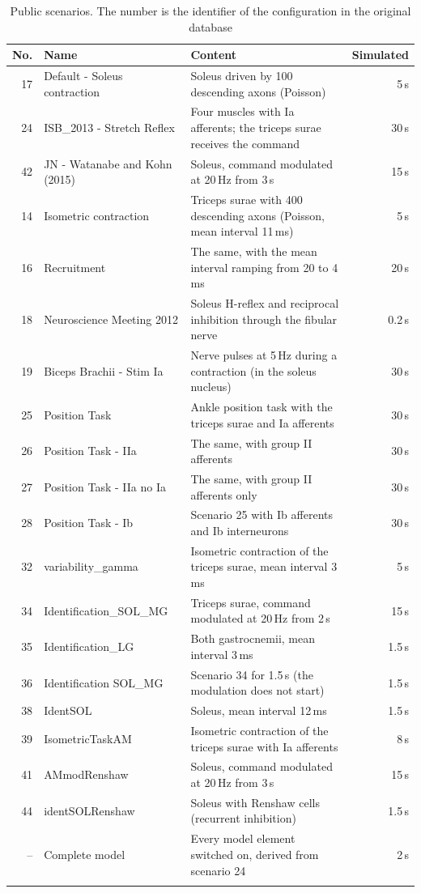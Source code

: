 \documentclass[pdflatex,sn-apa,iicol]{sn-jnl}
\begin{document}
\begin{table}[t]
\caption{Public scenarios. The number is the identifier of the configuration in the original database}\label{tab:scenarios}
\begin{tabular}{@{}rp{}p{}r@{}}
\toprule
No. & Name & Content & Simulated \\
\midrule
17 & Default - Soleus contraction & Soleus driven by 100 descending axons (Poisson) & 5\,s \\
24 & ISB\_2013 - Stretch Reflex & Four muscles with Ia afferents; the triceps surae receives the command & 30\,s \\
42 & JN - Watanabe and Kohn (2015) & Soleus, command modulated at 20\,Hz from 3\,s & 15\,s \\
14 & Isometric contraction & Triceps surae with 400 descending axons (Poisson, mean interval 11\,ms) & 5\,s \\
16 & Recruitment & The same, with the mean interval ramping from 20 to 4\,ms & 20\,s \\
18 & Neuroscience Meeting 2012 & Soleus H-reflex and reciprocal inhibition through the fibular nerve & 0.2\,s \\
19 & Biceps Brachii - Stim Ia & Nerve pulses at 5\,Hz during a contraction (in the soleus nucleus) & 30\,s \\
25 & Position Task & Ankle position task with the triceps surae and Ia afferents & 30\,s \\
26 & Position Task - IIa & The same, with group II afferents & 30\,s \\
27 & Position Task - IIa no Ia & The same, with group II afferents only & 30\,s \\
28 & Position Task - Ib & Scenario 25 with Ib afferents and Ib interneurons & 30\,s \\
32 & variability\_gamma & Isometric contraction of the triceps surae, mean interval 3\,ms & 5\,s \\
34 & Identification\_SOL\_MG & Triceps surae, command modulated at 20\,Hz from 2\,s & 15\,s \\
35 & Identification\_LG & Both gastrocnemii, mean interval 3\,ms & 1.5\,s \\
36 & Identification SOL\_MG & Scenario 34 for 1.5\,s (the modulation does not start) & 1.5\,s \\
38 & IdentSOL & Soleus, mean interval 12\,ms & 1.5\,s \\
39 & IsometricTaskAM & Isometric contraction of the triceps surae with Ia afferents & 8\,s \\
41 & AMmodRenshaw & Soleus, command modulated at 20\,Hz from 3\,s & 15\,s \\
44 & identSOLRenshaw & Soleus with Renshaw cells (recurrent inhibition) & 1.5\,s \\
-- & Complete model & Every model element switched on, derived from scenario 24 & 2\,s \\
\botrule
\end{tabular}
\end{table}
\end{document}
